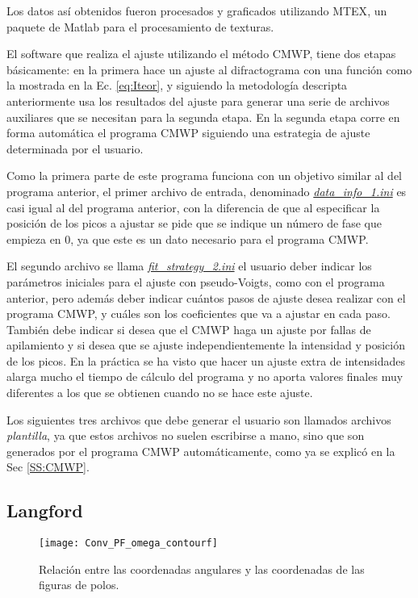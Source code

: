 Los datos así obtenidos fueron procesados y graficados utilizando MTEX\cite{Hielscher2008}, un paquete de Matlab para el procesamiento de texturas.

El software que realiza el ajuste utilizando el método CMWP, tiene dos etapas básicamente: en la primera hace un ajuste al difractograma con una función como la mostrada en la Ec. \ref{eq:Iteor}, y siguiendo la metodología descripta anteriormente usa los resultados del ajuste para generar una serie de archivos auxiliares que se necesitan para la segunda etapa.
En la segunda etapa corre en forma automática el programa CMWP siguiendo una estrategia de ajuste determinada por el usuario.

Como la primera parte de este programa funciona con un objetivo similar al del programa anterior, el primer archivo de entrada, denominado \hyperlink{dinfoCMWP}{\textit{data\_info\_1.ini}} es casi igual al del programa anterior, con la diferencia de que al especificar la posición de los picos a ajustar se pide que se indique un número de fase que empieza en 0, ya que este es un dato necesario para el programa CMWP.

El segundo archivo se llama \hyperlink{fitstrategy}{\textit{fit\_strategy\_2.ini}} el usuario deber indicar los parámetros iniciales para el ajuste con pseudo-Voigts, como con el programa anterior, pero además deber indicar cuántos pasos de ajuste desea realizar con el programa CMWP, y cuáles son los coeficientes que va a ajustar en cada paso.
También debe indicar si desea que el CMWP haga un ajuste por fallas de apilamiento  y si desea que se ajuste independientemente la intensidad y posición de los picos.
En la práctica se ha visto que hacer un ajuste extra de intensidades alarga mucho el tiempo de cálculo del programa y no aporta valores finales muy diferentes a los que se obtienen cuando no se hace este ajuste.

Los siguientes tres archivos que debe generar el usuario son llamados archivos \textit{plantilla}, ya que estos archivos no suelen escribirse a mano, sino que son generados por el programa CMWP automáticamente, como ya se explicó en la Sec \ref{SS:CMWP}.


\iffalse
\subsection{Langford}\label{SS:MLgfrd}

\begin{figure}[!htb]
  \centering
  \texttt{[image: Conv\_PF\_omega\_contourf]}
  \caption{Relación entre las coordenadas angulares y las coordenadas de las figuras de polos.}
  \label{fig:LabtoPF}
\end{figure}

